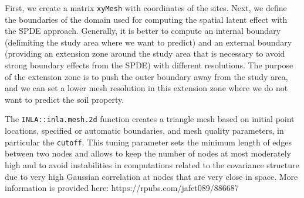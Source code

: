 \documentclass[
  a4paper,
]{article}
\begin{document}
First, we create a matrix \texttt{xyMesh} with coordinates of the sites.
Next, we define the boundaries of the domain used for computing the
spatial latent effect with the SPDE approach. Generally, it is better to
compute an internal boundary (delimiting the study area where we want to
predict) and an external boundary (providing an extension zone around
the study area that is necessary to avoid strong boundary effects from
the SPDE) with different resolutions. The purpose of the extension zone
is to push the outer boundary away from the study area, and we can set a
lower mesh resolution in this extension zone where we do not want to
predict the soil property.

The \texttt{INLA::inla.mesh.2d} function creates a triangle mesh based
on initial point locations, specified or automatic boundaries, and mesh
quality parameters, in particular the \texttt{cutoff}. This tuning
parameter sets the minimum length of edges between two nodes and allows
to keep the number of nodes at most moderately high and to avoid
instabilities in computations related to the covariance structure due to
very high Gaussian correlation at nodes that are very close in space.
More information is provided here: https://rpubs.com/jafet089/886687
\end{document}
